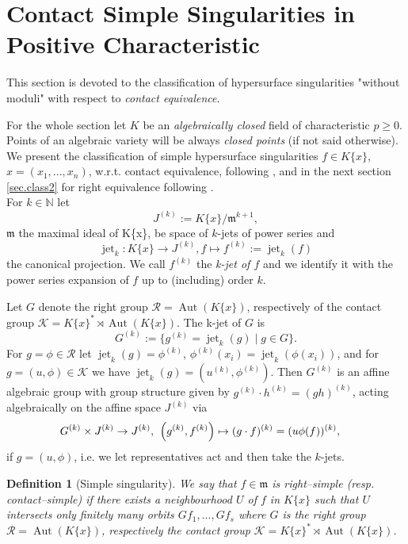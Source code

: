 \documentclass[11pt]{article}
\DeclareMathOperator{\Aut}{Aut}
\DeclareMathOperator{\jet}{jet}
\newtheorem{Definition}{Definition}[section]
\newcommand{\kk}{{\mathcal K}}
\newcommand{\kr}{{\mathcal R}}
\newcommand{\fm}{\mathfrak{m}}
\begin{document}

\section {Contact Simple Singularities in Positive Characteristic}\label{sec.class1}


This section is devoted to the classification of hypersurface singularities "without moduli" with respect to {\em contact equivalence}.

For the whole section let 
$K$ be an {\em algebraically closed} field  of characteristic $p \geq 0$. Points of an algebraic variety will be always {\em closed points} (if not said otherwise).
We present the classification of simple hypersurface singularities  $f \in K\{x\}$, 
\mbox{$x = (x_1,...,x_n)$},  w.r.t. contact equivalence, following \cite{GrKr90}, 
and  in the next section \ref{sec.class2} for right equivalence  following \cite{GN16}.\\

For $k\in \mathbb{N}$ let  
$$J^{(k)}:= K\{x\}/\fm^{k+1},$$
$\fm$  the maximal ideal of  K\{x\},  be space of $k$-jets of power series and 
$$\jet_k: K\{x\} \to J^{(k)}, f\mapsto f^{(k)}:= \jet_k(f)$$
 the canonical projection. 
We call
 $f^{(k)}$ the {\it k-jet of $f$}
 and we identify it
 with the power series expansion of $f$ up to (including) order $k$. 
 
 Let $G$ denote the right group $\kr= \Aut (K\{x\})$, respectively of the contact group $\kk=K\{x\}^* \rtimes \Aut (K\{x\})$. The k-jet of $G$ is
	$$G^{(k)}:=\{g^{(k)}=\jet_k(g)\mid g\in G\}.$$
For $g=\phi \in \kr$ let
 $\jet_k(g)= \phi^{(k)}$, 
$\phi^{(k)}(x_i) 
=\jet_k(\phi(x_i))$,  and
for $g=(u,\phi) \in \kk$  we have $\jet_k(g)= (u^{(k)},\phi^{(k)})$.
Then $G^{(k)}$ is an affine algebraic group with group structure given by $g^{(k)}\cdot  h^{(k)} = (gh)^{(k)}$, acting algebraically on the affine space $J^{(k)}$ via
\begin{align*}
	&G^{(k)}\times J^{(k)}\to J^{(k)}, \hskip4pt
	\left(g^{(k)}, f^{(k)}\right)\mapsto (g\cdot f)^{(k)} = (u \phi(f))^{(k)},
\end{align*}
if $g = (u,\phi)$, i.e. we let representatives act and then take the $k$-jets. \\

\begin{Definition}[Simple singularity]\label{def.simple}
We say that $f\in \fm$ is {\em  right--simple} (resp. {\em contact--simple}) if there 
 exists a neighbourhood $U$ of $f$ in $K\{x\}$ such that $U$ intersects only finitely many orbits $Gf_1,...,Gf_s$ where $G$ is the right group $\kr= \Aut (K\{x\})$, respectively the contact group $\kk=K\{x\}^* \rtimes \Aut (K\{x\})$.  
 \end{Definition}
 
\end{document}
